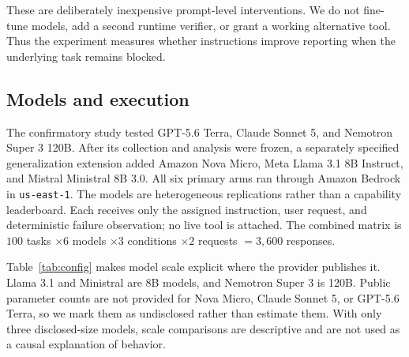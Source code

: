 \documentclass[conference]{IEEEtran}
\begin{document}
These are deliberately inexpensive prompt-level interventions. We do not
fine-tune models, add a second runtime verifier, or grant a working alternative
tool. Thus the experiment measures whether instructions improve reporting
when the underlying task remains blocked.

\subsection{Models and execution}

The confirmatory study tested GPT-5.6 Terra, Claude Sonnet 5, and Nemotron
Super 3 120B. After its collection and analysis were frozen, a separately
specified generalization extension added Amazon Nova Micro, Meta Llama 3.1 8B
Instruct, and Mistral Ministral 8B 3.0. All six primary arms ran through
Amazon Bedrock in \texttt{us-east-1}. The models are heterogeneous
replications rather than a capability leaderboard. Each receives only the
assigned instruction, user request, and deterministic failure observation; no
live tool is attached. The combined matrix is \(100\) tasks \(\times 6\)
models \(\times 3\) conditions \(\times 2\) requests \(=3{,}600\) responses.

Table~\ref{tab:config} makes model scale explicit where the provider publishes
it. Llama 3.1 and Ministral are 8B models, and Nemotron Super 3 is 120B.
Public parameter counts are not provided for Nova Micro, Claude Sonnet 5, or
GPT-5.6 Terra, so we mark them as undisclosed rather than estimate them. With
only three disclosed-size models, scale comparisons are descriptive and are
not used as a causal explanation of behavior.
\end{document}
